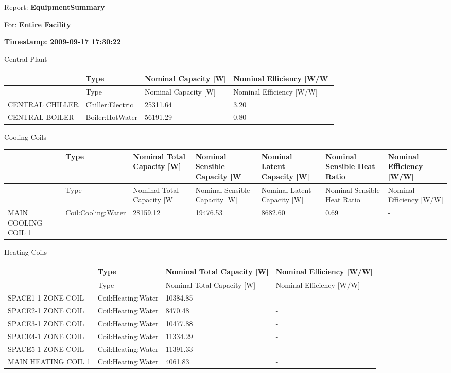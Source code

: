 Report: \textbf{EquipmentSummary}

For: \textbf{Entire Facility}

\textbf{Timestamp: 2009-09-17 17:30:22}

Central Plant

{\scriptsize
\begin{longtable}[c]{>{\raggedright}p{1.5in}>{\raggedright}p{1.5in}>{\raggedright}p{1.5in}>{\raggedright}p{1.5in}}
\toprule 
~ & Type & Nominal Capacity [W] & Nominal Efficiency [W/W] \tabularnewline
\midrule
\endfirsthead

\toprule 
~ & Type & Nominal Capacity [W] & Nominal Efficiency [W/W] \tabularnewline
\midrule
\endhead

CENTRAL CHILLER & Chiller:Electric & 25311.64 & 3.20 \tabularnewline
CENTRAL BOILER & Boiler:HotWater & 56191.29 & 0.80 \tabularnewline
\bottomrule
\end{longtable}}

Cooling Coils

{\scriptsize
\begin{longtable}[c]{>{\raggedright}p{0.85in}>{\raggedright}p{0.85in}>{\raggedright}p{0.85in}>{\raggedright}p{0.85in}>{\raggedright}p{0.85in}>{\raggedright}p{0.85in}>{\raggedright}p{0.85in}}
\toprule 
~ & Type & Nominal Total Capacity [W] & Nominal Sensible Capacity [W] & Nominal Latent Capacity [W] & Nominal Sensible Heat Ratio & Nominal Efficiency [W/W] \tabularnewline
\midrule
\endfirsthead

\toprule 
~ & Type & Nominal Total Capacity [W] & Nominal Sensible Capacity [W] & Nominal Latent Capacity [W] & Nominal Sensible Heat Ratio & Nominal Efficiency [W/W] \tabularnewline
\midrule
\endhead

MAIN COOLING COIL 1 & Coil:Cooling:Water & 28159.12 & 19476.53 & 8682.60 & 0.69 & - \tabularnewline
\bottomrule
\end{longtable}}

Heating Coils

\begin{longtable}[c]{>{\raggedright}p{1.5in}>{\raggedright}p{1.5in}>{\raggedright}p{1.5in}>{\raggedright}p{1.5in}}
\toprule 
~ & Type & Nominal Total Capacity [W] & Nominal Efficiency [W/W] \tabularnewline
\midrule
\endfirsthead

\toprule 
~ & Type & Nominal Total Capacity [W] & Nominal Efficiency [W/W] \tabularnewline
\midrule
\endhead

SPACE1-1 ZONE COIL & Coil:Heating:Water & 10384.85 & - \tabularnewline
SPACE2-1 ZONE COIL & Coil:Heating:Water & 8470.48 & - \tabularnewline
SPACE3-1 ZONE COIL & Coil:Heating:Water & 10477.88 & - \tabularnewline
SPACE4-1 ZONE COIL & Coil:Heating:Water & 11334.29 & - \tabularnewline
SPACE5-1 ZONE COIL & Coil:Heating:Water & 11391.33 & - \tabularnewline
MAIN HEATING COIL 1 & Coil:Heating:Water & 4061.83 & - \tabularnewline
\bottomrule
\end{longtable}


